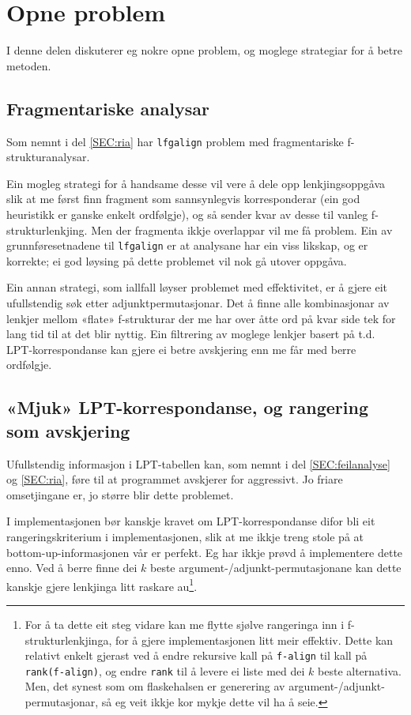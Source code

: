 \documentclass[11pt,a4paper,oneside,draft]{report}
\begin{document}
\section{Opne problem}
\label{sec-5.4}

   \label{SEC:opneproblem}

I denne delen diskuterer eg nokre opne problem, og moglege strategiar
for å betre metoden.

\subsection{Fragmentariske analysar}
\label{sec-5.4.1}

Som nemnt i del \ref{SEC:ria} har \texttt{lfgalign} problem med
fragmentariske f-strukturanalysar. 


Ein mogleg strategi for å handsame desse vil vere å dele opp
lenkjingsoppgåva slik at me først finn fragment som sannsynlegvis
korresponderar (ein god heuristikk er ganske enkelt ordfølgje), og så
sender kvar av desse til vanleg f-strukturlenkjing. Men der fragmenta
ikkje overlappar vil me få problem. Ein av grunnføresetnadene til
\texttt{lfgalign} er at analysane har ein viss likskap, og er korrekte; ei
god løysing på dette problemet vil nok gå utover oppgåva.

Ein annan strategi, som iallfall løyser problemet med effektivitet, er
å gjere eit ufullstendig søk etter adjunktpermutasjonar. Det å finne
alle kombinasjonar av lenkjer mellom «flate» f-strukturar der me har
over åtte ord på kvar side tek for lang tid til at det blir
nyttig. Ein filtrering av moglege lenkjer basert på
t.d. LPT-korrespondanse kan gjere ei betre avskjering enn me får med
berre ordfølgje.

\subsection{«Mjuk» LPT-korrespondanse, og rangering som avskjering}
\label{sec-5.4.2}

Ufullstendig informasjon i LPT-tabellen kan, som nemnt i del
\ref{SEC:feilanalyse} og \ref{SEC:ria}, føre til at programmet
avskjerer for aggressivt. Jo friare omsetjingane er, jo større blir
dette problemet.

I implementasjonen bør kanskje kravet om LPT-korrespondanse difor bli
eit rangeringskriterium i implementasjonen, slik at me ikkje treng
stole på at bottom-up-informasjonen vår er perfekt. Eg har ikkje prøvd
å implementere dette enno. Ved å berre finne dei $k$ beste
argument-/adjunkt-permutasjonane kan dette kanskje gjere lenkjinga
litt raskare au\footnote{For å ta dette eit steg vidare kan me flytte sjølve rangeringa
        inn i f-strukturlenkjinga, for å gjere implementasjonen litt
        meir effektiv. Dette kan relativt enkelt gjerast ved å endre
        rekursive kall på \texttt{f-align} til kall på \texttt{rank(f-align)}, og
        endre \texttt{rank} til å levere ei liste med dei $k$ beste
        alternativa. Men, det synest som om flaskehalsen er generering
        av argument-/adjunkt-permutasjonar, så eg veit ikkje kor mykje
        dette vil ha å seie. }.
\end{document}
